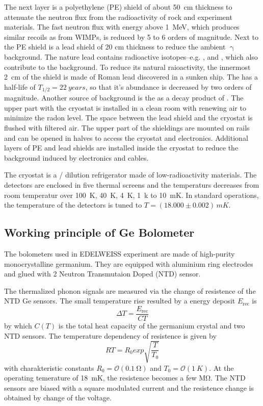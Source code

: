   The next layer is a polyethylene (PE) shield of about \SI{50}{cm} thickness to attenuate the neutron flux from the radioactivity of rock and experiment materials. The fast neutron flux with energy above \SI{1}{MeV}, which produces similar recoils as from WIMPs, is reduced by 5 to 6 orders of magnitude. %
  Next to the PE shield is a lead shield of 20 cm thickness to reduce the ambient $\upgamma$ background. The nature lead contains radioactive isotopes--e.g. ,  and , which also contribute to the background. To reduce its natural raioactivity, the innermost \SI{2}{cm} of the shield is made of Roman lead discovered in a sunken ship. The  has a half-life of $T_{1/2}=\SI{22}{years}$, so that it's abundance is decreased by two orders of magnitude. %
  Another source of background is the  as a decay product of . The upper part with the cryostat is installed in a clean room with renewing air to minimize the radon level. The space between the lead shield and the cryostat is flushed with filtered air.
  The upper part of the shieldings are mounted on rails and can be opened in halves to access the cryostat and electronics. Additional layers of PE and lead shields are installed inside the cryostat to reduce the background induced by electronics and cables.

  The cryostat is a / dilution refrigerator made of low-radioactivity materials. The detectors are enclosed in five thermal screens and the temperaturs decreases from room temperatur over \SI{100}{K}, \SI{40}{K}, \SI{4}{K}, \SI{1}{k} to \SI{10}{mK}. In standard operations, the temperature of the detectors is tuned to $T=(18.000 \pm 0.002)\,\si{mK}$.

\subsection{Working principle of Ge Bolometer}
  \label{edw-ge}
  The bolometers used in EDELWEISS experiment are made of high-purity monocrystalline germanium. They are equipped with aluminium ring electrodes and glued with 2 Neutron Transmutaion Doped (NTD) sensor.

  The thermalized phonon signals are measured via the change of resistence of the NTD Ge sensors. The small temperature rise resulted by a energy deposit $E_{\mathrm{rec}}$ is
  \begin{equation}
      \Delta T = \frac{E_{\mathrm{rec}}}{C{T}}
  \end{equation}
  by which $C(T)$ is the total heat capacity of the germanium crystal and two NTD sensors. The temperature dependency of resistence is given by
  \begin{equation}
    R{T}=R_{0}exp\sqrt{\frac{T}{T_{0}}}
  \end{equation}
  with charakteristic constants $R_{0}=\mathcal{O}(\SI{0.1}{\ohm})$ and $T_{0}=\mathcal{O}(\SI{1}{K})$. At the operating temerature of \SI{18}{mK}, the resistence becomes a few \si{\mega\ohm}. The NTD sensors are biased with a square modulated current and the resistence change is obtained by change of the voltage.%


